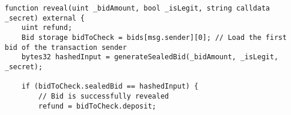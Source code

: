 \begin{lstlisting}[language=Solidity]
function reveal(uint _bidAmount, bool _isLegit, string calldata _secret) external {
	uint refund;
	Bid storage bidToCheck = bids[msg.sender][0]; // Load the first bid of the transaction sender
	bytes32 hashedInput = generateSealedBid(_bidAmount, _isLegit, _secret);
	
	if (bidToCheck.sealedBid == hashedInput) {
		// Bid is successfully revealed
		refund = bidToCheck.deposit;
\end{lstlisting}